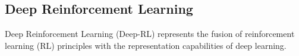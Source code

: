 
\subsection{Deep Reinforcement Learning}\label{subsection:bg:rl:deep-reinforcement-learning}

Deep Reinforcement Learning (Deep-RL) represents the fusion of reinforcement learning (RL) principles with the
representation capabilities of deep learning. %

